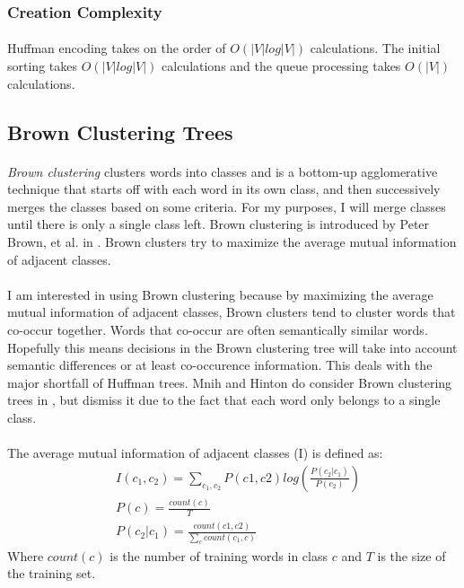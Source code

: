 \subsubsection{Creation Complexity}
\paragraph{}
Huffman encoding takes on the order of $O\left(|V| log |V| \right)$ calculations. The initial sorting takes $O\left(|V| log |V|\right)$ calculations and the queue processing takes $O(|V|)$ calculations.

\subsection{Brown Clustering Trees}
\paragraph{}
\emph{Brown clustering} clusters words into classes and is a bottom-up agglomerative technique that starts off with each word in its own class, and then successively merges the classes based on some criteria. For my purposes, I will merge classes until there is only a single class left.  Brown clustering is introduced by Peter Brown, et al. in \cite{Brown1992}.
Brown clusters try to maximize the average mutual information of adjacent classes.
\paragraph{}
I am interested in using Brown clustering because by maximizing the average mutual information of adjacent classes, Brown clusters tend to cluster words that co-occur together. Words that co-occur are often semantically similar words. Hopefully this means decisions in the Brown clustering tree will take into account semantic differences or at least co-occurence information. This deals with the major shortfall of Huffman trees. Mnih and Hinton do consider Brown clustering trees in \cite{MnihHinton2009}, but dismiss it due to the fact that each word only belongs to a single class. 
\paragraph{}
The average mutual information of adjacent classes (I) is defined as:
\begin{align}
& I(c_1,c_2) =\sum_{c_1,c_2} P(c1,c2)  log \left( \frac{P(c_2|c_1)}{P(c_2)} \right)
\\
&P(c) = \frac{count(c)}{T} \nonumber
\\
&P(c_2|c_1) = \frac{count(c1,c2)}{\sum_c count(c_1,c)} \nonumber
\end{align}
Where $count(c)$ is the number of training words in class $c$ and $T$ is the size of the training set.
